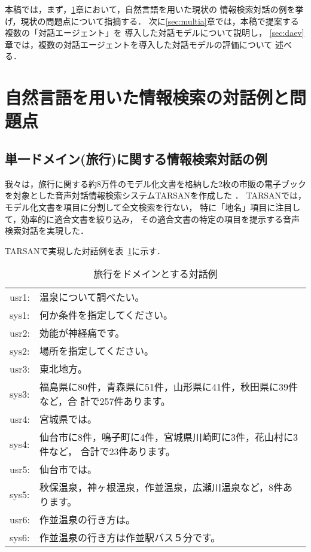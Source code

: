 本稿では，まず，\ref{sec:curnld}章において，自然言語を用いた現状の
情報検索対話の例を挙げ，現状の問題点について指摘する．
次に\ref{sec:multia}章では，本稿で提案する複数の「対話エージェント」を
導入した対話モデルについて説明し，
\ref{sec:daev}章では，複数の対話エージェントを導入した対話モデルの評価について
述べる．

\section{自然言語を用いた情報検索の対話例と問題点}\label{sec:curnld}

\subsection{単一ドメイン(旅行)に関する情報検索対話の例}

我々は，旅行に関する約8万件のモデル化文書を格納した2枚の市販の電子ブック
\cite{tabigura,jtb}を対象とした音声対話情報検索システムTARSANを作成した
\cite{tarsan}．
TARSANでは，モデル化文書を項目に分割して全文検索を行ない，
特に「地名」項目に注目して，効率的に適合文書を絞り込み，
その適合文書の特定の項目を提示する音声検索対話を実現した．

TARSANで実現した対話例を表~\ref{tab:travel}に示す．

\begin{table}[htp] 
\caption{旅行をドメインとする対話例}\label{tab:travel}
\bigskip\centering \tt

\begin{tabular}{lp{120mm}} \hline\hline
usr1:&温泉について調べたい。\rule{0pt}{10pt}\\
sys1:&何か条件を指定してください。\\
usr2:&効能が神経痛です。\\
sys2:&場所を指定してください。\\
usr3:&東北地方。\\
sys3:&福島県に80件，青森県に51件，山形県に41件，秋田県に39件など，合
計で257件あります。\\
usr4:&宮城県では。\\
sys4:&仙台市に8件，鳴子町に4件，宮城県川崎町に3件，花山村に3件など，
合計で23件あります。\\
usr5:&仙台市では。\\
sys5:&秋保温泉，神ヶ根温泉，作並温泉，広瀬川温泉など，8件あります。\\
usr6:&作並温泉の行き方は。\\
sys6:&作並温泉の行き方は作並駅バス５分です。\\
\hline\hline
\end{tabular}
\end{table}

